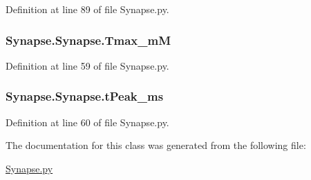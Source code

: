 Definition at line 89 of file Synapse.\-py.

\hypertarget{class_synapse_1_1_synapse_ae4bcd698c5be77c2a6629d511d75f046}{
\subsubsection[{Tmax\-\_\-m\-M}]{\setlength{\rightskip}{0pt plus 5cm}Synapse.\-Synapse.\-Tmax\-\_\-m\-M}}\label{class_synapse_1_1_synapse_ae4bcd698c5be77c2a6629d511d75f046}


Definition at line 59 of file Synapse.\-py.

\hypertarget{class_synapse_1_1_synapse_a09b9b092efcb0d6745fa32fadcd46375}{
\subsubsection[{t\-Peak\-\_\-ms}]{\setlength{\rightskip}{0pt plus 5cm}Synapse.\-Synapse.\-t\-Peak\-\_\-ms}}\label{class_synapse_1_1_synapse_a09b9b092efcb0d6745fa32fadcd46375}


Definition at line 60 of file Synapse.\-py.



The documentation for this class was generated from the following file\-:\begin{DoxyCompactItemize}
\item 
\hyperlink{_synapse_8py}{Synapse.\-py}\end{DoxyCompactItemize}
